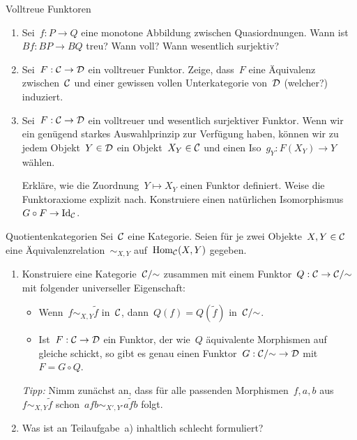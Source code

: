 \documentclass{uebblatt}
\begin{document}
\begin{aufgabe}{Volltreue Funktoren}
\begin{enumerate}
\item Sei~$f : P \to Q$ eine monotone Abbildung zwischen Quasiordnungen. Wann
ist~$Bf : BP \to BQ$ treu? Wann voll? Wann wesentlich surjektiv?
\item Sei~$F : \mathcal{C} \to \mathcal{D}$ ein volltreuer Funktor. Zeige, dass~$F$ eine Äquivalenz
zwischen~$\mathcal{C}$ und einer gewissen vollen Unterkategorie von~$\mathcal{D}$ (welcher?)
induziert.
\item Sei~$F : \mathcal{C} \to \mathcal{D}$ ein volltreuer und wesentlich surjektiver Funktor.
Wenn wir ein genügend starkes Auswahlprinzip zur Verfügung haben, können wir zu
jedem Objekt~$Y \in \mathcal{D}$ ein Objekt~$X_Y \in \mathcal{C}$ und einen
Iso~$g_Y : F(X_Y) \to Y$ wählen.

Erkläre, wie die Zuordnung~$Y \mapsto X_Y$ einen Funktor definiert. Weise die
Funk\-tor\-axiome explizit nach. Konstruiere einen natürlichen
Isomorphismus~$G \circ F \to \mathrm{Id}_{\mathcal{C}}$.
\end{enumerate}
\end{aufgabe}

\begin{aufgabe}{Quotientenkategorien}
Sei~$\mathcal{C}$ eine Kategorie. Seien für je zwei Objekte~$X,Y \in \mathcal{C}$ eine
Äquivalenzrelation~$\sim_{X,Y}$ auf~$\mathrm{Hom}_{\mathcal{C}}(X,Y)$ gegeben.
\begin{enumerate}
\item Konstruiere eine Kategorie~$\mathcal{C}/{\sim}$ zusammen mit einem Funktor~$Q : \mathcal{C}
\to \mathcal{C}/{\sim}$ mit folgender universeller Eigenschaft:
\begin{itemize}
\item Wenn~$f \sim_{X,Y} \tilde f$ in~$\mathcal{C}$, dann~$Q(f) = Q(\tilde f)$ in~$\mathcal{C}/{\sim}$.
\item Ist~$F : \mathcal{C} \to \mathcal{D}$ ein Funktor, der wie~$Q$ äquivalente Morphismen auf gleiche
schickt, so gibt es genau einen Funktor~$G : \mathcal{C}/{\sim} \to \mathcal{D}$ mit~$F = G \circ
Q$.
\end{itemize}

{\tiny
\emph{Tipp:} Nimm zunächst an, dass für alle passenden Morphismen~$f,a,b$
aus~$f \sim_{X,Y} \tilde f$ schon~$afb \sim_{X',Y'} a\tilde fb$ folgt.\par}

\item Was ist an Teilaufgabe~a) inhaltlich schlecht formuliert?
\end{enumerate}
\end{aufgabe}
\end{document}

